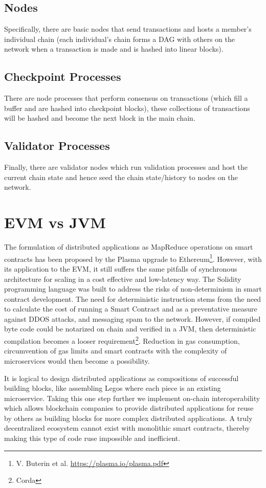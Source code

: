 \documentclass{article}
\begin{document}
\subsection{Nodes}
Specifically, there are basic nodes that send transactions and hosts a member's individual chain (each individual's chain forms a DAG with others on the network when a transaction is made and is hashed into linear blocks). 

\subsection{Checkpoint Processes}
There are node processes that perform consensus on transactions (which fill a buffer and are hashed into checkpoint blocks), these collections of transactions will be hashed and become the next block in the main chain. 

\subsection{Validator Processes}
Finally, there are validator nodes which run validation processes and host the current chain state and hence seed the chain state/history to nodes on the network. 

\section{EVM vs JVM}
The formulation of distributed applications as MapReduce operations on smart contracts has been proposed by the Plasma upgrade to Ethereum\footnote{V. Buterin et al. \url{https://plasma.io/plasma.pdf}}. However, with its application to the EVM, it still suffers the same pitfalls of synchronous architecture for scaling in a cost effective and low-latency way. The Solidity programming language was built to address the risks of non-determinism in smart contract development. The need for deterministic instruction stems from the need to calculate the cost of running a Smart Contract and as a preventative measure against DDOS attacks, and messaging spam to the network. However, if compiled byte code could be notarized on chain and verified in a JVM, then deterministic compilation becomes a looser requirement\footnote{Corda}. Reduction in gas consumption, circumvention of gas limits and smart contracts with the complexity of microservices would then become a possibility.

It is logical to design distributed applications as compositions of successful building blocks, like assembling Legos where each piece is an existing microservice. Taking this one step further we implement on-chain interoperability which allows blockchain companies to provide distributed applications for reuse by others as building blocks for more complex distributed applications. A truly decentralized ecosystem cannot exist with monolithic smart contracts, thereby making this type of code ruse impossible and inefficient. 
\end{document}
